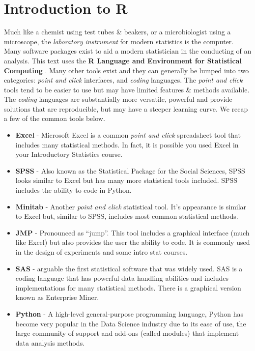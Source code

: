 \documentclass[
]{book}
\providecommand{\tightlist}{%
  \setlength{\itemsep}{0pt}\setlength{\parskip}{0pt}}
\begin{document}
\hypertarget{introduction-to-r}{%
\section{Introduction to R}\label{introduction-to-r}}

Much like a chemist using test tubes \& beakers, or a microbiologist using a microscope, the \emph{laboratory instrument} for modern statistics is the computer. Many software packages exist to aid a modern statistician in the conducting of an analysis. This text uses the \textbf{R Language and Environment for Statistical Computing} \citep{R-base}. Many other tools exist and they can generally be lumped into two categories: \emph{point and click} interfaces, and \emph{coding} languages. The \emph{point and click} tools tend to be easier to use but may have limited features \& methods available. The \emph{coding} languages are substantially more versatile, powerful and provide solutions that are reproducible, but may have a steeper learning curve. We recap a few of the common tools below.

\begin{itemize}
\tightlist
\item
  \textbf{Excel} - Microsoft Excel is a common \emph{point and click} spreadsheet tool that includes many statistical methods. In fact, it is possible you used Excel in your Introductory Statistics course.
\item
  \textbf{SPSS} - Also known as the Statistical Package for the Social Sciences, SPSS looks similar to Excel but has many more statistical tools included. SPSS includes the ability to code in Python.
\item
  \textbf{Minitab} - Another \emph{point and click} statistical tool. It's appearance is similar to Excel but, similar to SPSS, includes most common statistical methods.
\item
  \textbf{JMP} - Pronounced as ``jump''. This tool includes a graphical interface (much like Excel) but also provides the user the ability to code. It is commonly used in the design of experiments and some intro stat courses.
\item
  \textbf{SAS} - arguable the first statistical software that was widely used. SAS is a coding language that has powerful data handling abilities and includes implementations for many statistical methods. There is a graphical version known as Enterprise Miner.
\item
  \textbf{Python} - A high-level general-purpose programming language, Python has become very popular in the Data Science industry due to its ease of use, the large community of support and add-ons (called modules) that implement data analysis methods.
\end{itemize}
\end{document}
